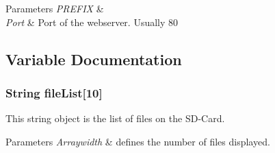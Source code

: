\begin{DoxyParams}{Parameters}
{\em P\-R\-E\-F\-I\-X} & \\
\hline
{\em Port} & Port of the webserver. Usually 80 \\
\hline
\end{DoxyParams}


\subsection{Variable Documentation}
\hypertarget{_c_n_c_interface_8ino_a5a05dbbdadb25aa91e63ea51a8a2ec14}{
\subsubsection[{file\-List}]{\setlength{\rightskip}{0pt plus 5cm}String file\-List\mbox{[}10\mbox{]}}}\label{_c_n_c_interface_8ino_a5a05dbbdadb25aa91e63ea51a8a2ec14}


This string object is the list of files on the S\-D-\/\-Card. 


\begin{DoxyParams}{Parameters}
{\em Arraywidth} & defines the number of files displayed. \\
\hline
\end{DoxyParams}
